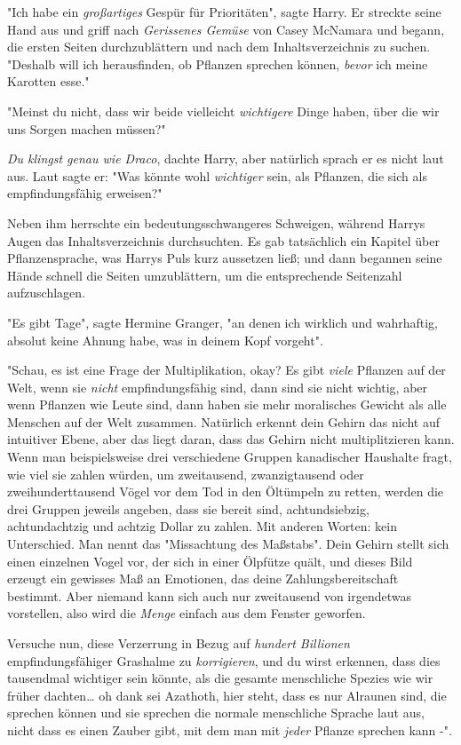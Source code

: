 {"Ich habe ein \emph{großartiges} Gespür für Prioritäten", sagte Harry. Er streckte seine Hand aus und griff nach \emph{Gerissenes Gemüse} von Casey McNamara und begann, die ersten Seiten durchzublättern und nach dem Inhaltsverzeichnis zu suchen. "Deshalb will ich herausfinden, ob Pflanzen sprechen können, \emph{bevor} ich meine Karotten esse."

"Meinst du nicht, dass wir beide vielleicht \emph{wichtigere} Dinge haben, über die wir uns Sorgen machen müssen?"

\emph{Du klingst genau wie Draco}, dachte Harry, aber natürlich sprach er es nicht laut aus. Laut sagte er: "Was könnte wohl \emph{wichtiger} sein, als Pflanzen, die sich als empfindungsfähig erweisen?"

Neben ihm herrschte ein bedeutungsschwangeres Schweigen, während Harrys Augen das Inhaltsverzeichnis durchsuchten. Es gab tatsächlich ein Kapitel über Pflanzensprache, was Harrys Puls kurz aussetzen ließ; und dann begannen seine Hände schnell die Seiten umzublättern, um die entsprechende Seitenzahl aufzuschlagen.

"Es gibt Tage", sagte Hermine Granger, "an denen ich wirklich und wahrhaftig, absolut keine Ahnung habe, was in deinem Kopf vorgeht".

"Schau, es ist eine Frage der Multiplikation, okay? Es gibt \emph{viele} Pflanzen auf der Welt, wenn sie \emph{nicht} empfindungsfähig sind, dann sind sie nicht wichtig, aber wenn Pflanzen wie Leute sind, dann haben sie mehr moralisches Gewicht als alle Menschen auf der Welt zusammen. Natürlich erkennt dein Gehirn das nicht auf intuitiver Ebene, aber das liegt daran, dass das Gehirn nicht multiplitzieren kann. Wenn man beispielsweise drei verschiedene Gruppen kanadischer Haushalte fragt, wie viel sie zahlen würden, um zweitausend, zwanzigtausend oder zweihunderttausend Vögel vor dem Tod in den Öltümpeln zu retten, werden die drei Gruppen jeweils angeben, dass sie bereit sind, achtundsiebzig, achtundachtzig und achtzig Dollar zu zahlen. Mit anderen Worten: kein Unterschied. Man nennt das "Missachtung des Maßstabs". Dein Gehirn stellt sich einen einzelnen Vogel vor, der sich in einer Ölpfütze quält, und dieses Bild erzeugt ein gewisses Maß an Emotionen, das deine Zahlungsbereitschaft bestimmt. Aber niemand kann sich auch nur zweitausend von irgendetwas vorstellen, also wird die \emph{Menge} einfach aus dem Fenster geworfen.

Versuche nun, diese Verzerrung in Bezug auf \emph{hundert Billionen} empfindungsfähiger Grashalme zu \emph{korrigieren}, und du wirst erkennen, dass dies tausendmal wichtiger sein könnte, als die gesamte menschliche Spezies wie wir früher dachten… oh dank sei Azathoth, hier steht, dass es nur Alraunen sind, die sprechen können und sie sprechen die normale menschliche Sprache laut aus, nicht dass es einen Zauber gibt, mit dem man mit \emph{jeder} Pflanze sprechen kann -".

}
